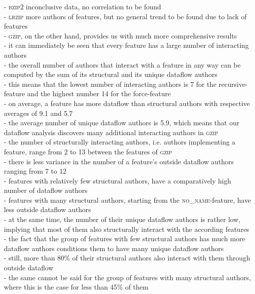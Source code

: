 - \textsc{bzip2} inconclusive data, no correlation to be found \\
- \textsc{lrzip} more authors of features, but no general trend to be found due to lack of features \\

- \textsc{gzip}, on the other hand, provides us with much more comprehensive results \\
- it can immediately be seen that every feature has a large number of interacting authors \\
- the overall number of authors that interact with a feature in any way can be computed by the sum of its structural and its unique dataflow authors \\
- this means that the lowest number of interacting authors is 7 for the \textsf{recursive}-feature and the highest number 14 for the \textsf{force}-feature \\
- on average, a feature has more dataflow than structural authors with respective averages of 9.1 and 5.7 \\
- the average number of unique dataflow authors is 5.9, which means that our dataflow analysis discovers many additional interacting authors in \textsc{gzip} \\
- the number of structurally interacting authors, i.e. authors implementing a feature, range from 2 to 13 between the features of \textsc{gzip} \\
- there is less variance in the number of a feature's outside dataflow authors ranging from 7 to 12 \\
- features with relatively few structural authors, have a comparatively high number of dataflow authors \\
- features with many structural authors, starting from the \textsc{no\_name}-feature, have less outside dataflow authors \\ 
- at the same time, the number of their unique dataflow authors is rather low, implying that most of them also structurally interact with the according features \\
- the fact that the group of features with few structural authors has much more dataflow authors conditions them to have many unique dataflow authors \\
- still, more than 80\% of their structural authors also interact with them through outside dataflow \\
- the same cannot be said for the group of features with many structural authors, where this is the case for less than 45\% of them \\
